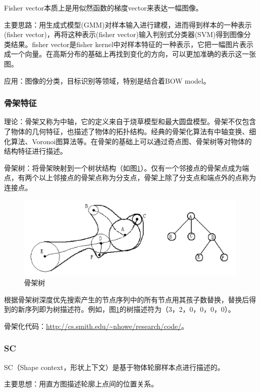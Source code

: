 \documentclass[12pt]{article}
\begin{document}
Fisher vector本质上是用似然函数的梯度vector来表达一幅图像。

{\color{blue}主要思路}：用生成式模型(GMM)对样本输入进行建模，进而得到样本的一种表示(fisher vector)，再将这种表示(fisher vector)输入判别式分类器(SVM)得到图像分类结果。fisher vector是fisher kernel中对样本特征的一种表示，它把一幅图片表示成一个向量。在高斯分布的基础上再找到变化的方向，可以更加准确的表示这一张图。

{\color{blue}应用}：图像的分类，目标识别等领域，特别是结合着BOW model。

\subsubsection{骨架特征}

理论：骨架又称为中轴，它的定义来自于烧草模型和最大圆盘模型。骨架不仅包含了物体的几何特征，也描述了物体的拓扑结构。经典的骨架化算法有中轴变换、细化算法、Voronoi图算法等。在骨架的基础上可以通过奇点图、骨架树等对物体的结构特征进行描述。

骨架树：将骨架映射到一个树状结构（如图\ref{fig:tree}）。仅有一个邻接点的骨架点成为端点，有两个以上邻接点的骨架点称为分支点，骨架上除了分支点和端点外的点称为连接点。
        \begin{figure}
            \centering
            \includegraphics[width=0.5\linewidth]{tree}
            \caption{骨架树}
            \label{fig:tree}
        \end{figure}
        根据骨架树深度优先搜索产生的节点序列中的所有节点用其孩子数替换，替换后得到的新序列即为树描述符。例如，图\ref{fig:tree}的树描述符为（3，2，0，0，0，0）。

骨架化代码：\url{http://cs.smith.edu/~nhowe/research/code/}。

\subsubsection{SC}
    
    SC\cite{belongie2002shape}（Shape context，形状上下文）是基于物体轮廓样本点进行描述的。
    
    {\color{blue}主要思想}：用直方图描述轮廓上点间的位置关系。
    
\end{document}

